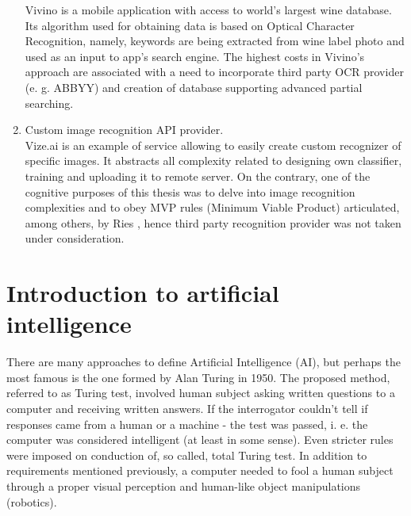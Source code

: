 \documentclass[11pt, a4paper]{article}
\begin{document}
\begin{enumerate}[1)]
Vivino is a mobile application with access to world's largest wine database. Its algorithm used for obtaining data is based on Optical Character Recognition, namely, keywords are being extracted from wine label photo and used as an input to app's search engine. The highest costs in Vivino's approach are associated with a need to incorporate third party OCR provider (e. g. ABBYY) and creation of database supporting advanced partial searching. 
\item Custom image recognition API provider.\\
Vize.ai is an example of service allowing to easily create custom recognizer of specific images. It abstracts all complexity related to designing own classifier, training and uploading it to remote server. On the contrary, one of the cognitive purposes of this thesis was to delve into image recognition complexities and to obey MVP rules (Minimum Viable Product) articulated, among others, by Ries \cite{lean_startup}, hence third party recognition provider was not taken under consideration.
\end{enumerate} 
\clearpage

\section{Introduction to artificial intelligence} \label{introduction_to_ai}
There are many approaches to define Artificial Intelligence (AI), but perhaps the most famous is the one formed by Alan Turing in 1950. The proposed method, referred to as Turing test, involved human subject asking written questions to a computer and receiving written answers. If the interrogator couldn't tell if responses came from a human or a machine - the test was passed, i. e. the computer was considered intelligent (at least in some sense). Even stricter rules were imposed on conduction of, so called, total Turing test. In addition to requirements mentioned previously, a computer needed to fool a human subject through a proper visual perception and human-like object manipulations (robotics).\\
\end{document}

